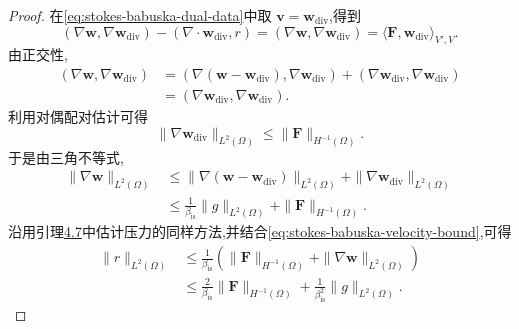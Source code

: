 \begin{proof}
在\cref{eq:stokes-babuska-dual-data}中取 $\bm{v}=\bm{w}_{\mathrm{div}}$,得到
\[
  (\nabla\bm{w},\nabla\bm{w}_{\mathrm{div}})
    -(\nabla\cdot\bm{w}_{\mathrm{div}},r)
   =(\nabla\bm{w},\nabla\bm{w}_{\mathrm{div}})
   =\langle\bm{F},\bm{w}_{\mathrm{div}}\rangle_{V',V}.
\]
由正交性,
\[
\begin{aligned}
  (\nabla\bm{w},\nabla\bm{w}_{\mathrm{div}})
   &=(\nabla(\bm{w}-\bm{w}_{\mathrm{div}}),
         \nabla\bm{w}_{\mathrm{div}})
      +(\nabla\bm{w}_{\mathrm{div}},\nabla\bm{w}_{\mathrm{div}})\\
   &=(\nabla\bm{w}_{\mathrm{div}},
         \nabla\bm{w}_{\mathrm{div}}).
\end{aligned}
\]
利用对偶配对估计可得
\[
  \|\nabla\bm{w}_{\mathrm{div}}\|_{L^2(\Omega)}
     \leq\|\bm{F}\|_{H^{-1}(\Omega)}.
\]
于是由三角不等式,
\begin{equation}\label{eq:stokes-babuska-velocity-bound}
\begin{aligned}
  \|\nabla\bm{w}\|_{L^2(\Omega)}
   &\leq\|\nabla(\bm{w}-\bm{w}_{\mathrm{div}})\|_{L^2(\Omega)}
       +\|\nabla\bm{w}_{\mathrm{div}}\|_{L^2(\Omega)}\\
   &\leq\frac{1}{\beta_{\mathrm{is}}}\|g\|_{L^2(\Omega)}
       +\|\bm{F}\|_{H^{-1}(\Omega)}.
\end{aligned}
\end{equation}
沿用引理\hyperref[lem:stokes-stability]{4.7}中估计压力的同样方法,并结合\cref{eq:stokes-babuska-velocity-bound},可得
\begin{equation}\label{eq:stokes-babuska-pressure-bound}
\begin{aligned}
  \|r\|_{L^2(\Omega)}
   &\leq\frac{1}{\beta_{\mathrm{is}}}
        \left(\|\bm{F}\|_{H^{-1}(\Omega)}
              +\|\nabla\bm{w}\|_{L^2(\Omega)}\right)\\
   &\leq\frac{2}{\beta_{\mathrm{is}}}\|\bm{F}\|_{H^{-1}(\Omega)}
       +\frac{1}{\beta_{\mathrm{is}}^2}\|g\|_{L^2(\Omega)}.
\end{aligned}
\end{equation}


\end{proof}
